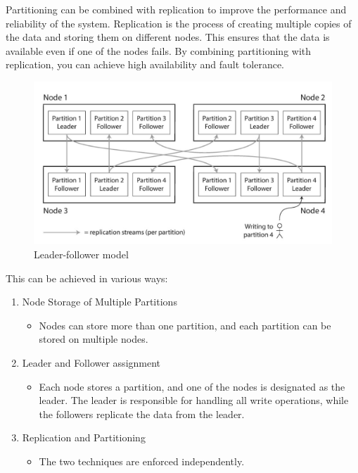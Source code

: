 \begin{paracol}{2}
   Partitioning can be combined with replication to improve the performance and reliability of the system. Replication is the process of creating multiple copies of the data and storing them on different nodes. This ensures that the data is available even if one of the nodes fails. By combining partitioning with replication, you can achieve high availability and fault tolerance.
   
   \switchcolumn

   \begin{figure}[htbp]
      \centering
      \includegraphics{images/11/leader_follower.png}
      \caption{Leader-follower model}
      \label{fig:11/leader_follower}
   \end{figure}
\end{paracol}

This can be achieved in various ways:
\begin{enumerate}
   \item Node Storage of Multiple Partitions
   \begin{itemize}
      \item Nodes can store more than one partition, and each partition can be stored on multiple nodes.
   \end{itemize}
   \item Leader and Follower assignment
   \begin{itemize}
      \item Each node stores a partition, and one of the nodes is designated as the leader. The leader is responsible for handling all write operations, while the followers replicate the data from the leader.
   \end{itemize}
   \item Replication and Partitioning
   \begin{itemize}
      \item The two techniques are enforced independently.
   \end{itemize}
\end{enumerate}

